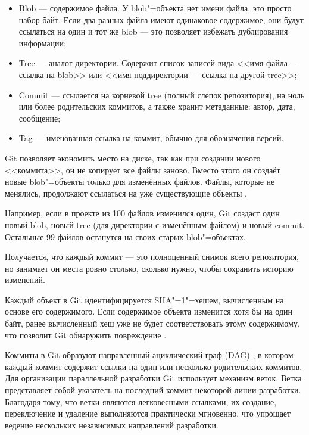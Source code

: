 \documentclass[coursework]{SCWorks}
\newcommand{\quot}[1]{<<#1>>}
\begin{document}
\begin{itemize}
	\item Blob --- содержимое файла. У blob"=объекта нет имени файла, это просто набор байт. Если два разных файла имеют одинаковое содержимое, они будут ссылаться на один и тот же blob --- это позволяет избежать дублирования информации;
	\item Tree --- аналог директории. Содержит список записей вида \quot{имя файла --- ссылка на blob} или \quot{имя поддиректории --- ссылка на другой tree};
	\item Commit --- ссылается на корневой tree (полный слепок репозитория), на ноль или более родительских коммитов, а также хранит метаданные: автор, дата, сообщение;
	\item Tag --- именованная ссылка на коммит, обычно для обозначения версий.
\end{itemize}

Git позволяет экономить место на диске, так как при создании нового \quot{коммита}, он не копирует все файлы заново. Вместо этого он создаёт новые blob"=объекты только для изменённых файлов. Файлы, которые не менялись, продолжают ссылаться на уже существующие объекты \cite{gitchaconobjects}.

Например, если в проекте из 100 файлов изменился один, Git создаст один новый blob, новый tree (для директории с изменённым файлом) и новый commit. Остальные 99 файлов останутся на своих старых blob"=объектах.

Получается, что каждый коммит --- это полноценный снимок всего репозитория, но занимает он места ровно столько, сколько нужно, чтобы сохранить историю изменений.

Каждый объект в Git идентифицируется SHA"=1"=хешем, вычисленным на основе его содержимого. Если содержимое объекта изменится хотя бы на один байт, ранее вычисленный хеш уже не будет соответствовать этому содержимому, что позволит Git обнаружить повреждение \cite{chacon2014pro}.

Коммиты в Git образуют направленный ациклический граф (DAG) \cite{aosagit}, в котором каждый коммит содержит ссылки на один или несколько родительских коммитов. Для организации параллельной разработки Git использует механизм веток. Ветка представляет собой указатель на последний коммит некоторой линии разработки. Благодаря тому, что ветки являются легковесными ссылками, их создание, переключение и удаление выполняются практически мгновенно, что упрощает ведение нескольких независимых направлений разработки.
\end{document}
